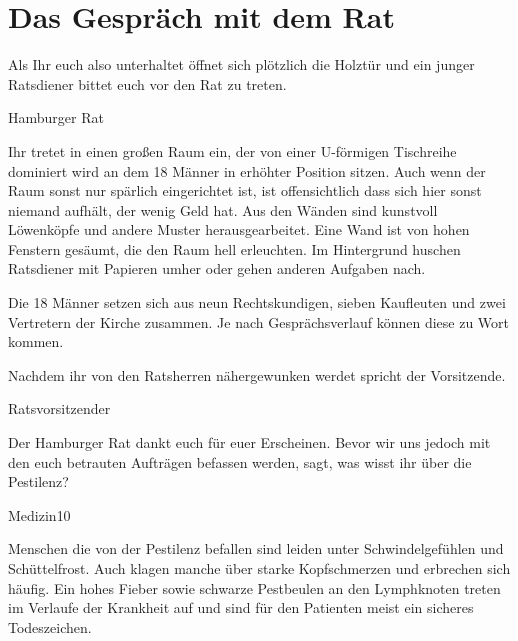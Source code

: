 \section*{Das Gespräch mit dem Rat}
\label{sec:ratsgespräch}

Als Ihr euch also unterhaltet öffnet sich plötzlich die Holztür und ein junger
Ratsdiener bittet euch vor den Rat zu treten.

\begin{place-box}{Hamburger Rat}

Ihr tretet in einen großen Raum ein, der von einer U-förmigen Tischreihe dominiert
wird an dem 18 Männer in erhöhter Position sitzen. Auch wenn der Raum sonst nur
spärlich eingerichtet ist, ist offensichtlich dass sich hier sonst niemand aufhält,
der wenig Geld hat. Aus den Wänden sind kunstvoll Löwenköpfe und andere Muster
herausgearbeitet. Eine Wand ist von hohen Fenstern gesäumt, die den Raum hell
erleuchten. Im Hintergrund huschen Ratsdiener mit Papieren umher oder gehen anderen
Aufgaben nach.

\end{place-box}

\begin{info-box}

Die 18 Männer setzen sich aus neun Rechtskundigen, sieben Kaufleuten und zwei
Vertretern der Kirche zusammen. Je nach Gesprächsverlauf können diese zu Wort kommen.

\end{info-box}

Nachdem ihr von den Ratsherren nähergewunken werdet spricht der Vorsitzende.

\begin{say-box}{Ratsvorsitzender}

Der Hamburger Rat dankt euch für euer Erscheinen. Bevor wir uns jedoch mit den euch
betrauten Aufträgen befassen werden, sagt, was wisst ihr über die Pestilenz?

\end{say-box}

\begin{probe-box}{Medizin}{10}

Menschen die von der Pestilenz befallen sind leiden unter Schwindelgefühlen und
Schüttelfrost. Auch klagen manche über starke Kopfschmerzen und erbrechen sich
häufig. Ein hohes Fieber sowie schwarze Pestbeulen an den Lymphknoten treten im
Verlaufe der Krankheit auf und sind für den Patienten meist ein sicheres
Todeszeichen.

\end{probe-box}

